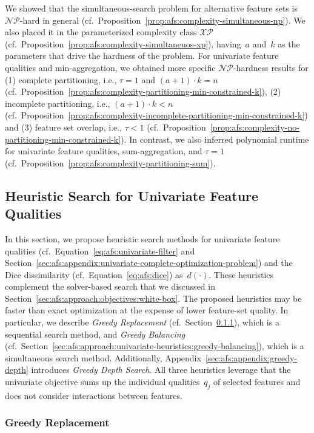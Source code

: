 \documentclass{article}
\theoremstyle{definition}
\begin{document}
We showed that the simultaneous-search problem for alternative feature sets is $\mathcal{NP}$-hard in general (cf.~Proposition~\ref{prop:afs:complexity-simultaneous-np}).
We also placed it in the parameterized complexity class $\mathcal{XP}$ (cf.~Proposition~\ref{prop:afs:complexity-simultaneuos-xp}), having~$a$ and~$k$ as the parameters that drive the hardness of the problem.
For univariate feature qualities and min-aggregation, we obtained more specific $\mathcal{NP}$-hardness results for (1) complete partitioning, i.e., $\tau = 1$ and $(a+1) \cdot k = n$ (cf.~Proposition~\ref{prop:afs:complexity-partitioning-min-constrained-k}), (2) incomplete partitioning, i.e., $(a+1) \cdot k < n$ (cf.~Proposition~\ref{prop:afs:complexity-incomplete-partitioning-min-constrained-k}) and (3) feature set overlap, i.e., $\tau < 1$ (cf.~Proposition~\ref{prop:afs:complexity-no-partitioning-min-constrained-k}).
In contrast, we also inferred polynomial runtime for univariate feature qualities, sum-aggregation, and $\tau = 1$ (cf.~Proposition~\ref{prop:afs:complexity-partitioning-sum}).

\subsection{Heuristic Search for Univariate Feature Qualities}
\label{sec:afs:approach:univariate-heuristics}

In this section, we propose heuristic search methods for univariate feature qualities (cf.~Equation~\ref{eq:afs:univariate-filter} and Section~\ref{sec:afs:appendix:univariate-complete-optimization-problem}) and the Dice dissimilarity (cf.~Equation~\ref{eq:afs:dice}) as~$d(\cdot)$.
These heuristics complement the solver-based search that we discussed in Section~\ref{sec:afs:approach:objectives:white-box}.
The proposed heuristics may be faster than exact optimization at the expense of lower feature-set quality.
In particular, we describe \emph{Greedy Replacement} (cf.~Section~\ref{sec:afs:approach:univariate-heuristics:greedy-replacement}), which is a sequential search method, and \emph{Greedy Balancing} (cf.~Section~\ref{sec:afs:approach:univariate-heuristics:greedy-balancing}), which is a simultaneous search method.
Additionally, Appendix~\ref{sec:afs:appendix:greedy-depth} introduces \emph{Greedy Depth Search}.
All three heuristics leverage that the univariate objective sums up the individual qualities~$q_j$ of selected features and does not consider interactions between features.

\subsubsection{Greedy Replacement}
\label{sec:afs:approach:univariate-heuristics:greedy-replacement}
\end{document}
